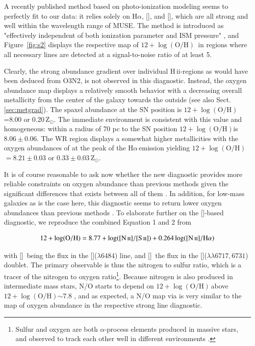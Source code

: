 \documentclass[traditabstract]{aa}
\newcommand{\ha}{H$\alpha$}
\newcommand{\hii}{\mbox{H\,{\sc ii}}}
\newcommand{\oh}{$12+\log(\mathrm{O/H})$}
\newcommand{\sii}{[\ion{S}{ii}]}
\newcommand{\nii}{[\ion{N}{ii}]}
\begin{document}
A recently published method based on photo-ionization modeling \citep{2016Ap&SS.361...61D} seems to perfectly fit to our data: it relies solely on \ha, \nii, and \sii, which are all strong and well within the wavelength range of MUSE. The method is introduced as "effectively independent of both ionization parameter and ISM pressure" \citep{2016Ap&SS.361...61D}, and Figure~\ref{fig:s2} displays the respective map of \oh\, in regions where all necessary lines are detected at a signal-to-noise ratio of at least 5.

Clearly, the strong abundance gradient over individual \hii-regions as would have been deduced from O3N2, is not observed in this diagnostic. Instead, the oxygen abundance map displays a relatively smooth behavior with a decreasing overall metallicity from the center of the galaxy towards the outside (see also Sect. \ref{sec:metgrad}). The spaxel abundance at the SN position is \oh=8.00 or 0.20\,Z$_{\odot}$. The immediate environment is consistent with this value and homogeneous: within a radius of 70 pc to the SN position \oh is $8.06\pm 0.06$. The WR region displays a somewhat higher metallicities with the oxygen abundances of at the peak of the \ha\,emission yielding \oh$=8.21\pm 0.03$ or $0.33\pm0.03\,$Z$_{\odot}$.

It is of course reasonable to ask now whether the new \citet{2016Ap&SS.361...61D} diagnostic provides more reliable constraints on oxygen abundance than previous methods given the significant differences that exists between all of them \citep{2016arXiv161108595B}. In addition, for low-mass galaxies as is the case here, this diagnostic seems to return lower oxygen abundances than previous methods \citep{2016ApJ...823L..24K}. To elaborate further on the \sii-based diagnostic, we reproduce the combined Equation 1 and 2 from \citet{2016Ap&SS.361...61D}

\begin{equation}
12+\log(\mathrm{O/H}) = 8.77 + \log([\ion{N}{ii}]/[\ion{S}{ii}]) + 0.264\log([]/\mathrm{H}\alpha)
\end{equation}

with \nii\, being the flux in the \nii($\lambda6484$) line, and \sii\, the flux in the \sii($\lambda\lambda6717,6731$) doublet. The primary observable is thus the nitrogen to sulfur ratio, which is a tracer of the nitrogen to oxygen ratio\footnote{Sulfur and oxygen are both $\alpha$-process elements produced in massive stars, and observed to track each other well in different environments \citep[see e.g. Figure 6 in][]{2006A&A...448..955I}.}. Because nitrogen is also produced in intermediate mass stars, N/O starts to depend on \oh\,above \oh$\sim 7.8$ \citep[e.g.][]{1999ApJ...511..639I, 2013A&A...549A..25P, 2016A&A...595A..62P}, and as expected, a N/O map via \citet{2010ApJ...715L.128A} is very similar to the map of oxygen abundance in the respective strong line diagnostic. 
\end{document}
